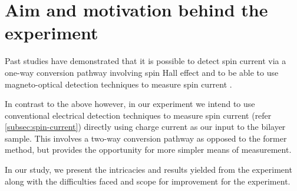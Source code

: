 \section{Aim and motivation behind the experiment}

Past studies have demonstrated that it is possible to detect spin current via a one-way conversion pathway involving spin Hall effect and to be able to use magneto-optical detection techniques to measure spin current \cite{Stamm_2017, valenzuela2007electrical}.

In contrast to the above however, in our experiment we intend to use conventional electrical detection techniques to measure spin current (refer \cref{subsec:spin-current}) directly using charge current as our input to the bilayer sample.
This involves a two-way conversion pathway as opposed to the former method, but provides the opportunity for more simpler means of measurement.

In our study, we present the intricacies and results yielded from the experiment along with the difficulties faced and scope for improvement for the experiment.
